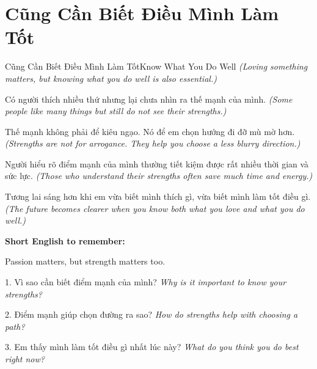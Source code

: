 \section{Cũng Cần Biết Điều Mình Làm Tốt}
\begin{truyen}{Cũng Cần Biết Điều Mình Làm Tốt}{Know What You Do Well}
\textit{(Loving something matters, but knowing what you do well is also essential.)}

Có người thích nhiều thứ nhưng lại chưa nhìn ra thế mạnh của mình.
\textit{(Some people like many things but still do not see their strengths.)}

Thế mạnh không phải để kiêu ngạo. Nó để em chọn hướng đi đỡ mù mờ hơn.
\textit{(Strengths are not for arrogance. They help you choose a less blurry direction.)}

Người hiểu rõ điểm mạnh của mình thường tiết kiệm được rất nhiều thời gian và sức lực.
\textit{(Those who understand their strengths often save much time and energy.)}
\end{truyen}

\begin{baihoc}
Tương lai sáng hơn khi em vừa biết mình thích gì, vừa biết mình làm tốt điều gì.
\textit{(The future becomes clearer when you know both what you love and what you do well.)}
\end{baihoc}

\begin{ghinhoanh}
\textbf{Short English to remember:}

Passion matters, but strength matters too.

\end{ghinhoanh}

\begin{tuhocnhanh}
1. Vì sao cần biết điểm mạnh của mình? \textit{Why is it important to know your strengths?}

2. Điểm mạnh giúp chọn đường ra sao? \textit{How do strengths help with choosing a path?}

3. Em thấy mình làm tốt điều gì nhất lúc này? \textit{What do you think you do best right now?}
\end{tuhocnhanh}
\ngancach

